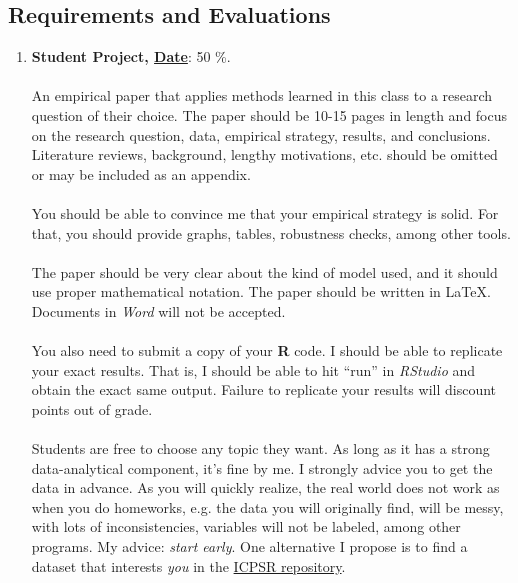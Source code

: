 \documentclass[letterpaper]{article}
\begin{document}
\subsection*{Requirements and Evaluations}

\begin{enumerate}

	\item {\bf Student Project, \underline{Date}}: 50 \%. 
	\\
	\\
	An empirical paper that applies methods learned in this class to a research question of their choice. The paper should be 10-15 pages in length and focus on the research question, data, empirical strategy, results, and conclusions. Literature reviews, background, lengthy motivations, etc. should be omitted or may be included as an appendix. 
	\\
	\\
	You should be able to convince me that your empirical strategy is solid. For that, you should provide graphs, tables, robustness checks, among other tools. 
	\\
	\\
	The paper should be very clear about the kind of model used, and it should use proper mathematical notation. The paper should be written in \LaTeX. Documents in \emph{Word} will not be accepted.
	\\
	\\
	You also need to submit a copy of your {\bf R} code. I should be able to replicate your exact results. That is, I should be able to hit ``run'' in \emph{RStudio} and obtain the exact same output. Failure to replicate your results will discount points out of grade.
	\\
	\\
	Students are free to choose any topic they want. As long as it has a strong data-analytical component, it's fine by me. I strongly advice you to get the data in advance. As you will quickly realize, the real world does not work as when you do homeworks, e.g. the data you will originally find, will be messy, with lots of inconsistencies, variables will not be labeled, among other programs. My advice: \emph{start early}. One alternative I propose is to find a dataset that interests \emph{you} in the \href{https://www.icpsr.umich.edu/icpsrweb/ICPSR/access/subject.jsp}{ICPSR repository}.



\end{enumerate}
\end{document}
